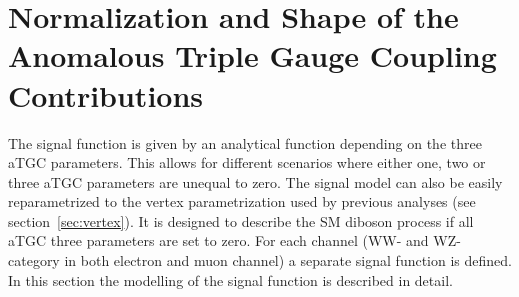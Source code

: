 \section{Normalization and Shape of the Anomalous Triple Gauge Coupling Contributions}
\label{sec:NormalizationandShapeoftheaTGCContributions}

The signal function is given by an analytical function depending on the three aTGC parameters. This allows for different scenarios where either one, two or three aTGC parameters are unequal to zero. The signal model can also be easily reparametrized to the vertex parametrization used by previous analyses (see section~\ref{sec:vertex}). It is designed to describe the SM diboson process if all aTGC three parameters are set to zero. For each channel (WW- and WZ-category in both electron and muon channel) a separate signal function is defined. In this section the modelling of the signal function is described in detail.

